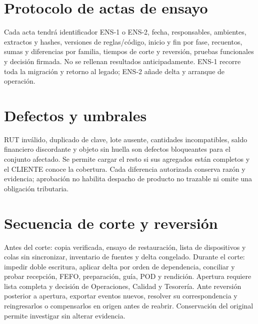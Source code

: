 \section*{Protocolo de actas de ensayo}
Cada acta tendrá identificador ENS-1 o ENS-2, fecha, responsables, ambientes, extractos y hashes, versiones de reglas/código, inicio y fin por fase, recuentos, sumas y diferencias por familia, tiempos de corte y reversión, pruebas funcionales y decisión firmada. No se rellenan resultados anticipadamente. ENS-1 recorre toda la migración y retorno al legado; ENS-2 añade delta y arranque de operación.

\section*{Defectos y umbrales}
RUT inválido, duplicado de clave, lote ausente, cantidades incompatibles, saldo financiero discordante y objeto sin huella son defectos bloqueantes para el conjunto afectado. Se permite cargar el resto si sus agregados están completos y el CLIENTE conoce la cobertura. Cada diferencia autorizada conserva razón y evidencia; aprobación no habilita despacho de producto no trazable ni omite una obligación tributaria.

\section*{Secuencia de corte y reversión}
Antes del corte: copia verificada, ensayo de restauración, lista de dispositivos y colas sin sincronizar, inventario de fuentes y delta congelado. Durante el corte: impedir doble escritura, aplicar delta por orden de dependencia, conciliar y probar recepción, FEFO, preparación, guía, POD y rendición. Apertura requiere lista completa y decisión de Operaciones, Calidad y Tesorería. Ante reversión posterior a apertura, exportar eventos nuevos, resolver su correspondencia y reingresarlos o compensarlos en origen antes de reabrir. Conservación del original permite investigar sin alterar evidencia.
